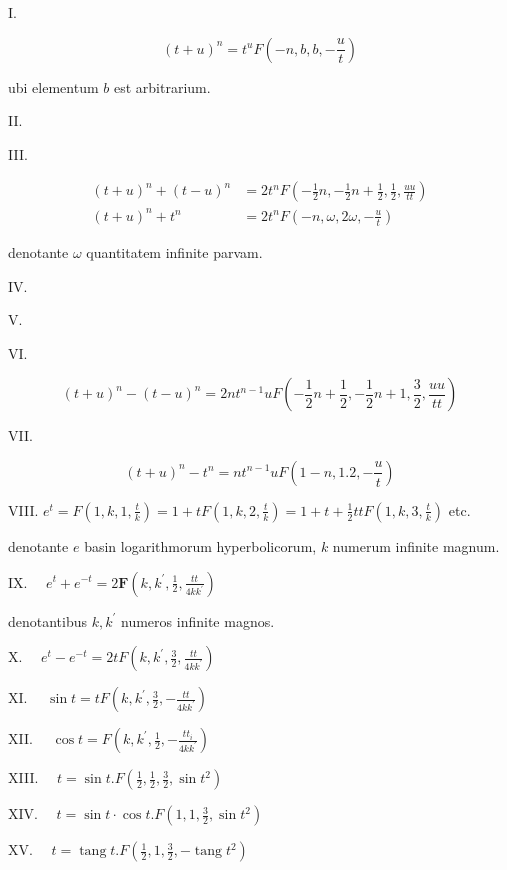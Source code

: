 \documentclass[10pt]{article}
\begin{document}
I.

\[
(t+u)^{n}=t^{u} F\left(-n, b, b,-\frac{u}{t}\right)
\]

ubi elementum \(b\) est arbitrarium.

II.

III.

\[
\begin{aligned}
(t+u)^{n}+(t-u)^{n} & =2 t^{n} F\left(-\frac{1}{2} n,-\frac{1}{2} n+\frac{1}{2}, \frac{1}{2}, \frac{u u}{t t}\right) \\
(t+u)^{n}+t^{n} & =2 t^{n} F\left(-n, \omega, 2 \omega,-\frac{u}{t}\right)
\end{aligned}
\]

denotante \(\omega\) quantitatem infinite parvam.

IV.

V.

VI.

\[
(t+u)^{n}-(t-u)^{n}=2 n t^{n-1} u F\left(-\frac{1}{2} n+\frac{1}{2},-\frac{1}{2} n+1, \frac{3}{2}, \frac{u u}{t t}\right)
\]

VII.

\[
(t+u)^{n}-t^{n}=n t^{n-1} u F\left(1-n, 1.2,-\frac{u}{t}\right)
\]

VIII. \(e^{t}=F\left(1, k, 1, \frac{t}{k}\right)=1+t F\left(1, k, 2, \frac{t}{k}\right)=1+t+\frac{1}{2} t t F\left(1, k, 3, \frac{t}{k}\right)\) etc.

denotante \(e\) basin logarithmorum hyperbolicorum, \(k\) numerum infinite magnum.

IX. \(\quad e^{t}+e^{-t}=2 \boldsymbol{F}\left(k, k^{\prime}, \frac{1}{2}, \frac{t t}{4 k k^{\prime}}\right)\)

denotantibus \(k, k^{\prime}\) numeros infinite magnos.

X. \(\quad e^{t}-e^{-t}=2 t F\left(k, k^{\prime}, \frac{3}{2}, \frac{t t}{4 k k^{\prime}}\right)\)

XI. \(\quad \sin t=t F\left(k, k^{\prime}, \frac{3}{2},-\frac{t t}{4 k k^{\prime}}\right)\)

XII. \(\quad \cos t=F\left(k, k^{\prime}, \frac{1}{2},-\frac{t t_{i}}{4 k k^{\prime}}\right)\)

XIII. \(\quad t=\sin t . F\left(\frac{1}{2}, \frac{1}{2}, \frac{3}{2}, \sin t^{2}\right)\)

XIV. \(\quad t=\sin t \cdot \cos t . F\left(1,1, \frac{3}{2}, \sin t^{2}\right)\)

XV. \(\quad t=\operatorname{tang} t . F\left(\frac{1}{2}, 1, \frac{3}{2},-\operatorname{tang} t^{2}\right)\)
\end{document}
